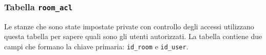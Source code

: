 \subsubsection{Tabella \texttt{room\_acl}}

Le stanze che sono state impostate private con controllo degli accessi utilizzano questa tabella per sapere quali sono gli utenti autorizzati. La tabella contiene due campi che formano la chiave primaria: \texttt{id\_room} e \texttt{id\_user}.


\newpage